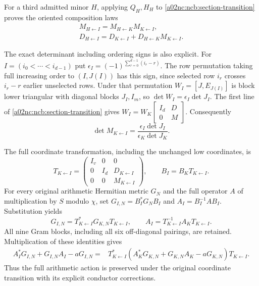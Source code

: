 For a third admitted minor $H$, applying $Q_H,H_H$ to
\eqref{a02nc:ncb:section-transition} proves the oriented composition laws
\begin{equation}\tag{NCB19}\label{a02nc:ncb:cocycle}
\begin{gathered}
M_{H\leftarrow I}=M_{H\leftarrow K}M_{K\leftarrow I},\\
D_{H\leftarrow I}
 =D_{K\leftarrow I}+D_{H\leftarrow K}M_{K\leftarrow I}.
\end{gathered}
\end{equation}

The exact determinant including ordering signs is also explicit.
For $I=(i_0<\cdots<i_{d-1})$ put
$\epsilon_I=(-1)^{\sum_{r=0}^{d-1}(i_r-r)}$.
The row permutation taking full increasing order to $(I,J(I))$
has this sign, since selected row $i_r$ crosses $i_r-r$ earlier
unselected rows. Under that permutation $W_I=[J,E_{J(I)}]$ is
block lower triangular with diagonal blocks $J_I,I_m$, so
$\det W_I=\epsilon_I\det J_I$. The first line of
\eqref{a02nc:ncb:section-transition} gives
$W_I=W_K\left[\begin{smallmatrix}I_d&D\\0&M\end{smallmatrix}\right]$.
Consequently
\begin{equation}\tag{NCB20}\label{a02nc:ncb:dettransition}
\det M_{K\leftarrow I}
 =\frac{\epsilon_I\det J_I}{\epsilon_K\det J_K}.
\end{equation}

The full coordinate transformation, including the unchanged low
coordinates, is
\begin{equation}\tag{NCB21}\label{a02nc:ncb:full-transition}
T_{K\leftarrow I}=
\begin{pmatrix}I_v&0&0\\0&I_d&D_{K\leftarrow I}\\
0&0&M_{K\leftarrow I}\end{pmatrix},
\qquad B_I=B_KT_{K\leftarrow I}.
\end{equation}
For every original arithmetic Hermitian metric $G_N$ and the full
operator $A$ of multiplication by $S$ modulo $\chi$, set
$G_{I,N}=B_I^*G_NB_I$ and $A_I=B_I^{-1}AB_I$. Substitution yields
\begin{equation}\tag{NCB22}\label{a02nc:ncb:gram-action}
G_{I,N}=T_{K\leftarrow I}^*G_{K,N}T_{K\leftarrow I},\qquad
A_I=T_{K\leftarrow I}^{-1}A_KT_{K\leftarrow I}.
\end{equation}
All nine Gram blocks, including all six off-diagonal pairings, are
retained. Multiplication of these identities gives
\begin{equation}\tag{NCB23}\label{a02nc:ncb:centered-action}
\begin{split}
A_I^*G_{I,N}+G_{I,N}A_I-aG_{I,N}
={}&T_{K\leftarrow I}^*
(A_K^*G_{K,N}+G_{K,N}A_K-aG_{K,N})T_{K\leftarrow I}.
\end{split}
\end{equation}
Thus the full arithmetic action is preserved under the original
coordinate transition with its explicit conductor corrections.

